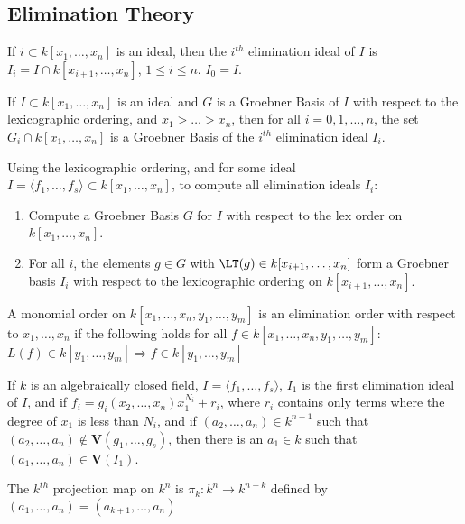 \documentclass[crop=false,class=book]{standalone}
\begin{document}
\subsection{Elimination Theory}
\begin{definition}
If $i\subset k[x_1,\hdots ,x_n]$ is an ideal, then the $i^{th}$ elimination ideal of $I$ is $I_{i} = I\cap k[x_{i+1},\hdots, x_n]$, $1\leq i \leq n$. $I_{0} = I$.
\end{definition}
\begin{theorem}
If $I\subset k[x_1,\hdots ,x_n]$ is an ideal and $G$ is a Groebner Basis of $I$ with respect to the lexicographic ordering, and $x_1>\hdots > x_n$, then for all $i=0,1,\hdots, n$, the set $G_i \cap k[x_1,\hdots ,x_n]$ is a Groebner Basis of the $i^{th}$ elimination ideal $I_{i}$.
\end{theorem}
\begin{remark}
Using the lexicographic ordering, and for some ideal $I = \langle f_1,\hdots, f_s\rangle \subset k[x_1,\hdots ,x_n]$, to compute all elimination ideals $I_{i}$:
\begin{enumerate}
    \item Compute a Groebner Basis $G$ for $I$ with respect to the lex order on $k[x_1,\hdots ,x_n]$.
    \item For all $i$, the elements $g\in G$ with $\LT(g)\in k[x_{i+1},\hdots, x_n]$ form a Groebner basis $I_{i}$ with respect to the lexicographic ordering on $k[x_{i+1},\hdots, x_n]$.
\end{enumerate}
\end{remark}
\begin{definition}
A monomial order on $k[x_1,\hdots, x_n,y_1,\hdots, y_m]$ is an elimination order with respect to $x_1,\hdots, x_n$ if the following holds for all $f\in k[x_1,\hdots, x_n, y_1, \hdots, y_m]$: $L(f) \in k[y_1,\hdots, y_m] \Rightarrow f\in k[y_1,\hdots, y_m]$
\end{definition}
\begin{theorem}
If $k$ is an algebraically closed field, $I = \langle f_1,\hdots, f_s\rangle$, $I_{1}$ is the first elimination ideal of $I$, and if $f_i = g_i(x_2,\hdots, x_n)x_1^{N_i}+r_i$, where $r_i$ contains only terms where the degree of $x_1$ is less than $N_i$, and if $(a_2,\hdots, a_n)\in k^{n-1}$ such that $(a_2,\hdots, a_n) \notin \mathbf{V}(g_1,\hdots, g_s)$, then there is an $a_1 \in k$ such that $(a_1,\hdots, a_n) \in \mathbf{V}(I_1)$.
\end{theorem}
\begin{definition}
The $k^{th}$ projection map on $k^n$ is $\pi_{k}: k^n\rightarrow k^{n-k}$ defined by $(a_1,\hdots, a_n) = (a_{k+1},\hdots, a_n)$
\end{definition}
\end{document}
